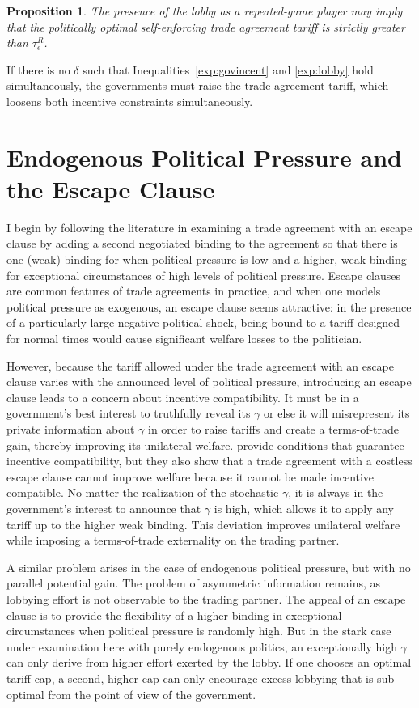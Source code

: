 \documentclass[12pt,titlepage]{article}
\newtheorem{proposition}{Proposition}
\newcommand{\ga}{\gamma}
\newcommand{\de}{\delta}
\begin{document}
\begin{proposition}
  The presence of the lobby as a repeated-game player may imply that the politically optimal self-enforcing trade agreement tariff is strictly greater than $\tau_e^R$.
	\label{res:repeated}
\end{proposition}

If there is no $\de$ such that Inequalities~\ref{exp:govincent} and \ref{exp:lobby} hold simultaneously, the governments must raise the trade agreement tariff, which loosens both incentive constraints simultaneously.

\section{Endogenous Political Pressure and the Escape Clause}
\label{sec:escape}
I begin by following the literature in examining a trade agreement with an escape clause by adding a second negotiated binding to the agreement so that there is one (weak) binding for when political pressure is low and a higher, weak binding for exceptional circumstances of high levels of political pressure. Escape clauses are common features of trade agreements in practice, and when one models political pressure as exogenous, an escape clause seems attractive: in the presence of a particularly large negative political shock, being bound to a tariff designed for normal times would cause significant welfare losses to the politician.

However, because the tariff allowed under the trade agreement with an escape clause varies with the announced level of political pressure, introducing an escape clause leads to a concern about incentive compatibility. It must be in a government's best interest to truthfully reveal its $\ga$ or else it will misrepresent its private information about $\ga$ in order to raise tariffs and create a terms-of-trade gain, thereby improving its unilateral welfare. \Textcite{bs2005} provide conditions that guarantee incentive compatibility, but they also show that a trade agreement with a costless escape clause cannot improve welfare because it cannot be made incentive compatible. No matter the realization of the stochastic $\ga$, it is always in the government's interest to announce that $\ga$ is high, which allows it to apply any tariff up to the higher weak binding. This deviation improves unilateral welfare while imposing a terms-of-trade externality on the trading partner.

A similar problem arises in the case of endogenous political pressure, but with no parallel potential gain. The problem of asymmetric information remains, as lobbying effort is not observable to the trading partner. The appeal of an escape clause is to provide the flexibility of a higher binding in exceptional circumstances when political pressure is randomly high. But in the stark case under examination here with purely endogenous politics, an exceptionally high $\ga$ can only derive from higher effort exerted by the lobby. If one chooses an optimal tariff cap, a second, higher cap can only encourage excess lobbying that is sub-optimal from the point of view of the government.
\end{document}
